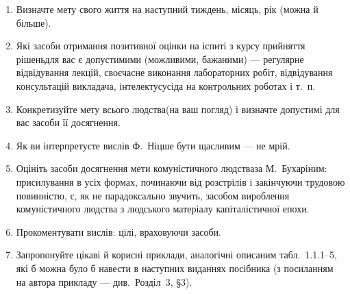 \documentclass[a4paper, 12pt]{article}
\begin{document}
\begin{enumerate}
	\item Визначте мету свого життя на наступний тиждень, місяць, рік (можна й більше).

	\item Які засоби отримання позитивної оцінки на іспиті з курсу  прийняття рішень\guillemotright для вас є допустимими (можливими, бажаними) --- регулярне відвідування лекцій, своєчасне виконання лабораторних робіт, відвідування консультацій викладача,  інтелекту\guillemotright сусіда на контрольних роботах і т.~п.

	\item Конкретизуйте мету  всього людства\guillemotright (на ваш погляд) і визначте допустимі для вас засоби її досягнення.

	\item Як ви інтерпретуєте вислів Ф.~Ніцше  бути щасливим --- не мрій\guillemotright.

	\item Оцініть засоби досягнення мети  комуністичного людства\guillemotright за М.~Бухаріним:  присилування в усіх формах, починаючи від розстрілів і закінчуючи трудовою повинністю, є, як не парадоксально звучить, засобом вироблення комуністичного людства з людського матеріалу капіталістичної епохи\guillemotright.

	\item Прокоментувати вислів:  цілі, враховуючи засоби\guillemotright.

	\item Запропонуйте цікаві й корисні приклади, аналогічні описаним табл.~1.1.1--5, які б можна було б навести в наступних виданнях посібника (з посиланням на автора прикладу --- див.~Розділ~3, \S3).
\end{enumerate}
\end{document}
